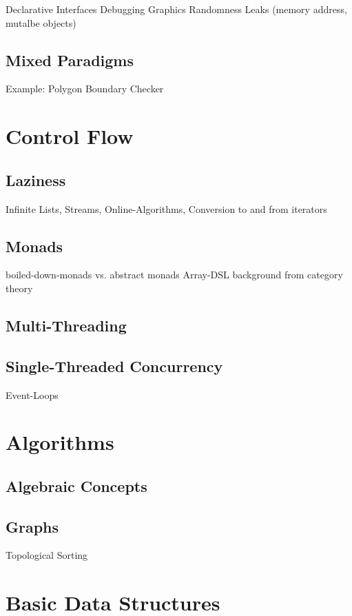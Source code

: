 \documentclass{book}
\begin{document}
Declarative Interfaces
Debugging Graphics
Randomness
Leaks (memory address, mutalbe objects)

\section{Mixed Paradigms}
Example: Polygon Boundary Checker


\chapter{Control Flow}

\section{Laziness}

Infinite Lists, Streams, Online-Algorithms, Conversion to and from iterators

\section{Monads}


boiled-down-monads vs. abstract monads
Array-DSL
background from category theory

\section{Multi-Threading}
\section{Single-Threaded Concurrency}
Event-Loops

\chapter{Algorithms}

\section{Algebraic Concepts}

\section{Graphs}
Topological Sorting

\chapter{Basic Data Structures}
\end{document}
